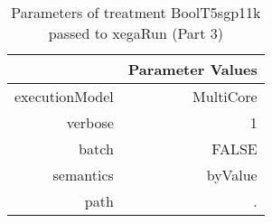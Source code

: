 \begin{table}[ht]
\centering
\begin{tabular}{rr}
  \hline
 & Parameter Values \\ 
  \hline
executionModel & MultiCore \\ 
  verbose & 1 \\ 
  batch & FALSE \\ 
  semantics & byValue \\ 
  path & . \\ 
   \hline
\end{tabular}
\caption{ Parameters of treatment BoolT5sgp11k passed to xegaRun
 (Part 3)} 
\end{table}
